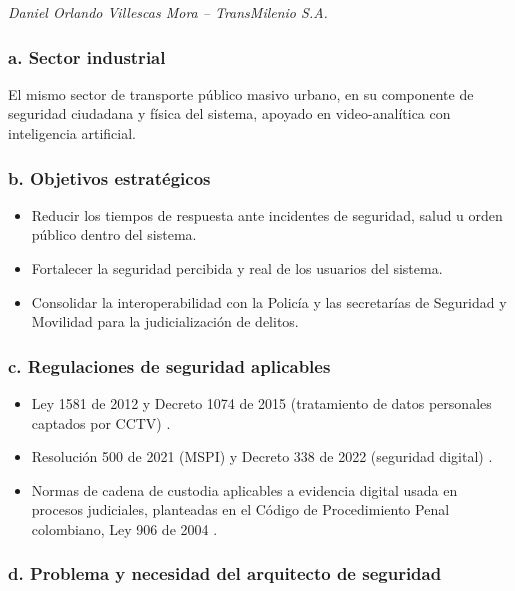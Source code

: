 \textit{Daniel Orlando Villescas Mora -- TransMilenio S.A.}

\subsubsection*{a. Sector industrial}

El mismo sector de transporte público masivo urbano, en su componente de seguridad ciudadana y física del sistema, apoyado en video-analítica con inteligencia artificial.

\subsubsection*{b. Objetivos estratégicos}

\begin{itemize}
	\item Reducir los tiempos de respuesta ante incidentes de seguridad, salud u orden público dentro del sistema.
	\item Fortalecer la seguridad percibida y real de los usuarios del sistema.
	\item Consolidar la interoperabilidad con la Policía y las secretarías de Seguridad y Movilidad para la judicialización de delitos.
\end{itemize}

\subsubsection*{c. Regulaciones de seguridad aplicables}

\begin{itemize}
	\item Ley 1581 de 2012 y Decreto 1074 de 2015 (tratamiento de datos personales captados por CCTV) \parencite{ley1581de2012,decreto1074de2015}.
	\item Resolución 500 de 2021 (MSPI) y Decreto 338 de 2022 (seguridad digital) \parencite{mintic2021,decreto338de2022}.
	\item Normas de cadena de custodia aplicables a evidencia digital usada en procesos judiciales, planteadas en el Código de Procedimiento Penal colombiano, Ley 906 de 2004 \parencite{ley906de2004}.
\end{itemize}

\subsubsection*{d. Problema y necesidad del arquitecto de seguridad}

